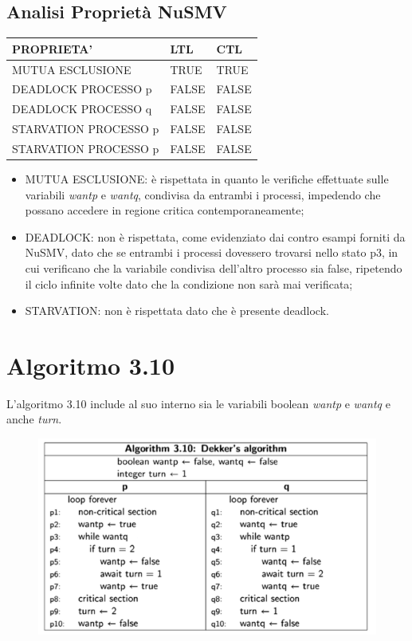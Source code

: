 \documentclass{article}
\begin{document}
\subsection{Analisi Proprietà NuSMV}
\begin{tabular}{|p{6cm}||p{3cm}|p{3cm}|}
\hline
PROPRIETA' & LTL & CTL\\
\hline
 MUTUA ESCLUSIONE&TRUE&TRUE \\
 DEADLOCK PROCESSO p&FALSE&FALSE\\
 DEADLOCK PROCESSO q&FALSE&FALSE\\
 STARVATION PROCESSO p&FALSE&FALSE\\
 STARVATION PROCESSO p&FALSE&FALSE\\
\hline
\end{tabular}
\begin{itemize}
    \item MUTUA ESCLUSIONE: è rispettata in quanto le verifiche effettuate sulle variabili \textit{wantp} e \textit{wantq}, condivisa da entrambi i processi, impedendo che possano accedere in regione critica contemporaneamente;
    \item DEADLOCK: non è rispettata, come evidenziato dai contro esampi forniti da NuSMV, dato che se entrambi i processi dovessero trovarsi nello stato p3, in cui verificano che la variabile condivisa dell'altro processo sia false, ripetendo il ciclo infinite volte dato che la condizione non sarà mai verificata;
    \item STARVATION: non è rispettata dato che è presente deadlock.
\end{itemize}
\clearpage
\section{Algoritmo 3.10}
L'algoritmo 3.10 include al suo interno sia le variabili boolean \textit{wantp} e \textit{wantq} e anche \textit{turn}.
\begin{figure}[h] 
\centering
\includegraphics[scale=0.6]{3.10.png}
\end{figure}
\clearpage
\end{document}
